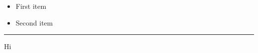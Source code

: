 \begin{itemize}
\color{blue}
\item First item
\item Second item
\end{itemize}
 
\noindent
{\color{red} \rule{\linewidth}{0.5mm} }
Hi